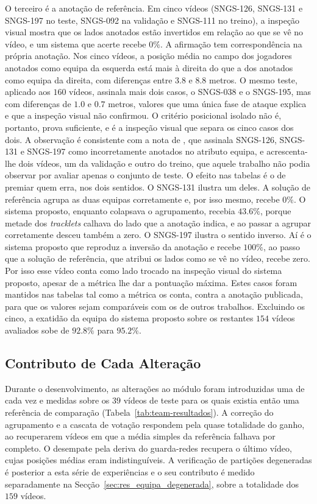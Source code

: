 O terceiro é a anotação de referência. Em cinco vídeos (SNGS-126, SNGS-131 e SNGS-197 no
teste, SNGS-092 na validação e SNGS-111 no treino), a inspeção visual mostra que os lados anotados
estão invertidos em relação ao que se vê no vídeo, e um sistema que acerte recebe $0\%$. A afirmação
tem correspondência na própria anotação. Nos cinco vídeos, a posição média no campo dos jogadores
anotados como equipa da esquerda está mais à direita do que a dos anotados como equipa da direita,
com diferenças entre $3.8$ e $8.8$ metros. O mesmo teste, aplicado aos $160$ vídeos, assinala mais
dois casos, o SNGS-038 e o SNGS-195, mas com diferenças de $1.0$ e $0.7$ metros, valores que uma
única fase de ataque explica e que a inspeção visual não confirmou. O critério posicional isolado
não é, portanto, prova suficiente, e é a inspeção visual que separa os cinco casos dos dois. A
observação é consistente com
a nota de \citet{oo2026broadcast2pitch}, que assinala
SNGS-126, SNGS-131 e SNGS-197 como incorretamente anotados no atributo equipa, e acrescenta-lhe dois
vídeos, um da validação e outro do treino, que aquele trabalho não podia observar por avaliar apenas
o conjunto de teste. O efeito nas tabelas é o de premiar quem erra, nos dois sentidos. O SNGS-131 ilustra um deles. A
solução de referência agrupa as duas equipas corretamente e, por isso mesmo, recebe $0\%$. O sistema
proposto, enquanto colapsava o agrupamento, recebia $43.6\%$, porque metade dos \emph{tracklets}
calhava do lado que a anotação indica, e ao passar a agrupar corretamente desceu também a zero. O
SNGS-197 ilustra o sentido inverso. Aí é o sistema proposto que reproduz a inversão da anotação e
recebe $100\%$, ao passo que a solução de referência, que atribui os lados como se vê no vídeo,
recebe zero. Por isso esse vídeo conta como lado trocado na inspeção visual do sistema proposto,
apesar de a métrica lhe dar a pontuação máxima.
Estes casos foram mantidos nas tabelas tal como a métrica os conta, contra a anotação publicada,
para que os valores sejam comparáveis com os de outros trabalhos. Excluindo os cinco, a exatidão da
equipa do sistema proposto sobre os restantes $154$ vídeos avaliados sobe de $92.8\%$ para
$95.2\%$.

\subsection{Contributo de Cada Alteração}\label{sec:res_equipa_ablacao}

Durante o desenvolvimento, as alterações ao módulo foram introduzidas uma de cada vez e medidas
sobre os $39$ vídeos de teste para os quais existia então uma referência de comparação
(Tabela~\ref{tab:team-resultados}). A correção do agrupamento e a cascata de votação respondem pela
quase totalidade do ganho, ao recuperarem vídeos em que a média simples da referência falhava por
completo. O desempate pela deriva do guarda-redes recupera o último vídeo, cujas posições médias
eram indistinguíveis. A verificação de partições degeneradas é posterior a esta série de
experiências e o seu contributo é medido separadamente na
Secção~\ref{sec:res_equipa_degenerada}, sobre a totalidade dos $159$ vídeos.

